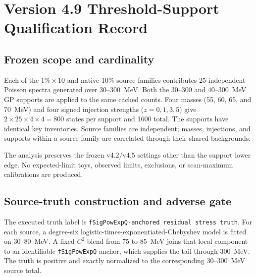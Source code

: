 \section{Version 4.9 Threshold-Support Qualification Record}
\label{app:v4p9-threshold-qualification}

\begin{center}
\end{center}

\subsection{Frozen scope and cardinality}

Each of the $1\%\times10$ and native-10\% source families contributes 25 independent
Poisson spectra generated over 30--300~MeV.  Both the 30--300 and 40--300~MeV GP
supports are applied to the same cached counts.  Four masses (55, 60, 65, and
70~MeV) and four signed injection strengths ($z=0,1,3,5$) give
$2\times25\times4\times4=800$ states per support and 1600 total.  The supports have
identical key inventories.  Source families are independent; masses, injections, and
supports within a source family are correlated through their shared backgrounds.

The analysis preserves the frozen v4.2/v4.5 settings other than the support lower
edge.  No expected-limit toys, observed limits, exclusions, or scan-maximum
calibrations are produced.

\subsection{Source-truth construction and adverse gate}

The executed truth label is
\texttt{fSigPowExpQ-anchored residual stress truth}.  For each source, a degree-six
logistic-times-exponentiated-Chebyshev model is fitted on 30--80~MeV.  A fixed $C^2$
blend from 75 to 85~MeV joins that local component to an identifiable
\texttt{fSigPowExpQ} anchor, which supplies the tail through 300~MeV.  The truth is
positive and exactly normalized to the corresponding 30--300~MeV source total.

